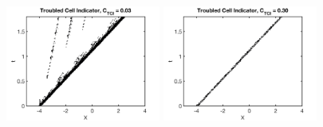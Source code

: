 \documentclass[letterpaper]{jpconf}
\begin{document}
\begin{figure}[h]
\begin{minipage}{12pc}
    \includegraphics[width=12pc]{./Figures/ShuOsher_TCI_0015_Astronum_2018}
  \end{minipage}\hspace{0.5pc}%
  \begin{minipage}{12pc}
    \includegraphics[width=12pc]{./Figures/ShuOsher_TCI_0150_Astronum_2018}
  \end{minipage}\hspace{0.5pc}
  \begin{minipage}{12pc}

\end{minipage}
\end{figure}
\end{document}
